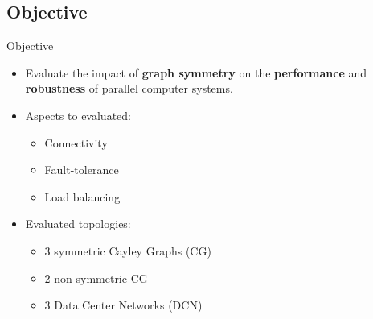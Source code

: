 \subsection{Objective}
\begin{frame}[t]{Objective}
\begin{itemize}
    \item Evaluate the impact of \textbf{graph symmetry} on the \textbf{performance} and \textbf{robustness} of parallel computer systems.
    \item Aspects to evaluated:
    \begin{itemize}
        \item Connectivity
        \item Fault-tolerance
        \item Load balancing
    \end{itemize}
    \item Evaluated topologies:
    \begin{itemize}
        \item 3 symmetric Cayley Graphs (CG)
        \item 2 non-symmetric CG
        \item 3 Data Center Networks (DCN)
    \end{itemize}
\end{itemize}
\end{frame}
